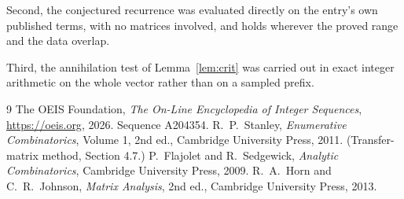 \documentclass[11pt,a4paper]{article}
\theoremstyle{plain}
\theoremstyle{definition}
\begin{document}
Second, the conjectured recurrence was evaluated directly on the entry's own published terms,
with no matrices involved, and holds wherever the proved range and the data overlap.

Third, the annihilation test of Lemma~\ref{lem:crit} was carried out in exact integer
arithmetic on the whole vector rather than on a sampled prefix.

\begin{thebibliography}{9}
 The OEIS Foundation, \emph{The On-Line Encyclopedia of Integer
Sequences}, \url{https://oeis.org}, 2026. Sequence A204354.
 R.~P.~Stanley, \emph{Enumerative Combinatorics}, Volume 1, 2nd ed.,
Cambridge University Press, 2011. (Transfer-matrix method, Section 4.7.)
 P.~Flajolet and R.~Sedgewick, \emph{Analytic Combinatorics}, Cambridge
University Press, 2009.
 R.~A.~Horn and C.~R.~Johnson, \emph{Matrix Analysis}, 2nd ed., Cambridge
University Press, 2013.
\end{thebibliography}
\end{document}
